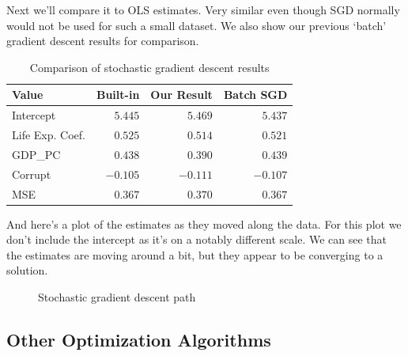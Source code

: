 \documentclass[
  letterpaper,
]{krantz}
\begin{document}
Next we'll compare it to OLS estimates. Very similar even though SGD
normally would not be used for such a small dataset. We also show our
previous `batch' gradient descent results for comparison.

\begin{longtable}{lrrr}

\caption{\label{tbl-stochastic-gradient-descent}Comparison of stochastic
gradient descent results}

\tabularnewline

\toprule
Value & Built-in & Our Result & Batch SGD \\ 
\midrule\addlinespace[2.5pt]
Intercept & \textcolor[HTML]{404040}{$5.445$} & \textcolor[HTML]{404040}{$5.469$} & \textcolor[HTML]{404040}{$5.437$} \\ 
Life Exp. Coef. & \textcolor[HTML]{404040}{$0.525$} & \textcolor[HTML]{404040}{$0.514$} & \textcolor[HTML]{404040}{$0.521$} \\ 
GDP\_PC & \textcolor[HTML]{404040}{$0.438$} & \textcolor[HTML]{404040}{$0.390$} & \textcolor[HTML]{404040}{$0.439$} \\ 
Corrupt & \textcolor[HTML]{404040}{$-0.105$} & \textcolor[HTML]{404040}{$-0.111$} & \textcolor[HTML]{404040}{$-0.107$} \\ 
MSE & \textcolor[HTML]{404040}{$0.367$} & \textcolor[HTML]{404040}{$0.370$} & \textcolor[HTML]{404040}{$0.367$} \\ 
\bottomrule

\end{longtable}

And here's a plot of the estimates as they moved along the data. For
this plot we don't include the intercept as it's on a notably different
scale. We can see that the estimates are moving around a bit, but they
appear to be converging to a solution.

\begin{figure}[H]


\caption{\label{fig-r-stochastic-gradient-descent}Stochastic gradient
descent path}

\end{figure}%

\subsection{Other Optimization
Algorithms}\label{sec-estim-opt-algos-other}
\end{document}
